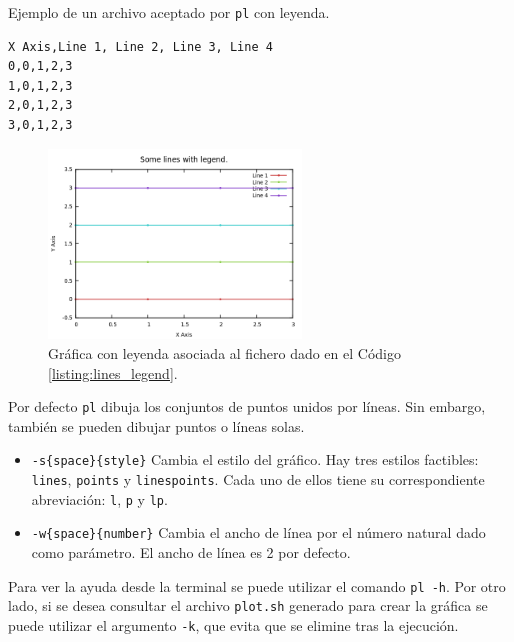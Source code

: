 \documentclass{article}
\begin{document}
		\begin{listing}
			\caption{Ejemplo de un archivo aceptado por \texttt{pl} con leyenda.}
			\begin{verbatim}
X Axis,Line 1, Line 2, Line 3, Line 4
0,0,1,2,3
1,0,1,2,3
2,0,1,2,3
3,0,1,2,3
			\end{verbatim}
			\label{listing:lines_legend}
		\end{listing}

       \begin{figure}[H]
	       	\centering
	       	\includegraphics[width=0.6\textwidth]{../../images/my_plot.png}
	       	\caption{Gráfica con leyenda asociada al fichero dado en el Código \ref{listing:lines_legend}.}
	       	\label{fig:legend}
       \end{figure}

		Por defecto \texttt{pl} dibuja los conjuntos de puntos unidos por líneas. Sin embargo, también se pueden dibujar puntos o líneas solas.

		\begin{itemize}
			\item \texttt{-s\{space\}\{style\}} Cambia el estilo del gráfico. Hay tres estilos factibles: \texttt{lines}, \texttt{points} y \texttt{linespoints}. Cada uno de ellos tiene su correspondiente abreviación: \texttt{l}, \texttt{p} y \texttt{lp}.
			
			\item \texttt{-w\{space\}\{number\}} Cambia el ancho de línea por el número natural dado como parámetro. El ancho de línea es 2 por defecto.
		\end{itemize}
		
		Para ver la ayuda desde la terminal se puede utilizar el comando \texttt{pl -h}. Por otro lado, si se desea consultar el archivo \texttt{plot.sh} generado para crear la gráfica se puede utilizar el argumento \texttt{-k}, que evita que se elimine tras la ejecución.
		
\end{document}
